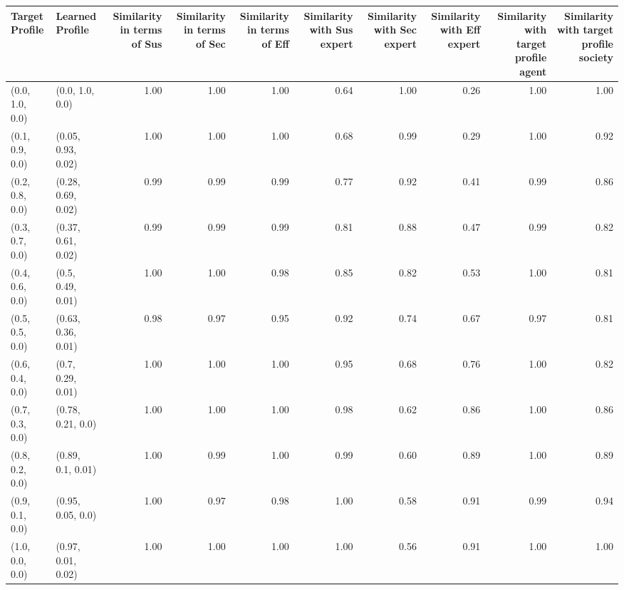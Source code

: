 \begin{tabular}{llrrrrrrrr}
\toprule
Target Profile & Learned Profile & Similarity in terms of Sus & Similarity in terms of Sec & Similarity in terms of Eff & Similarity with Sus expert & Similarity with Sec expert & Similarity with Eff expert & Similarity with target profile agent & Similarity with target profile society \\
\midrule
(0.0, 1.0, 0.0) & (0.0, 1.0, 0.0) & 1.00 & 1.00 & 1.00 & 0.64 & 1.00 & 0.26 & 1.00 & 1.00 \\
(0.1, 0.9, 0.0) & (0.05, 0.93, 0.02) & 1.00 & 1.00 & 1.00 & 0.68 & 0.99 & 0.29 & 1.00 & 0.92 \\
(0.2, 0.8, 0.0) & (0.28, 0.69, 0.02) & 0.99 & 0.99 & 0.99 & 0.77 & 0.92 & 0.41 & 0.99 & 0.86 \\
(0.3, 0.7, 0.0) & (0.37, 0.61, 0.02) & 0.99 & 0.99 & 0.99 & 0.81 & 0.88 & 0.47 & 0.99 & 0.82 \\
(0.4, 0.6, 0.0) & (0.5, 0.49, 0.01) & 1.00 & 1.00 & 0.98 & 0.85 & 0.82 & 0.53 & 1.00 & 0.81 \\
(0.5, 0.5, 0.0) & (0.63, 0.36, 0.01) & 0.98 & 0.97 & 0.95 & 0.92 & 0.74 & 0.67 & 0.97 & 0.81 \\
(0.6, 0.4, 0.0) & (0.7, 0.29, 0.01) & 1.00 & 1.00 & 1.00 & 0.95 & 0.68 & 0.76 & 1.00 & 0.82 \\
(0.7, 0.3, 0.0) & (0.78, 0.21, 0.0) & 1.00 & 1.00 & 1.00 & 0.98 & 0.62 & 0.86 & 1.00 & 0.86 \\
(0.8, 0.2, 0.0) & (0.89, 0.1, 0.01) & 1.00 & 0.99 & 1.00 & 0.99 & 0.60 & 0.89 & 1.00 & 0.89 \\
(0.9, 0.1, 0.0) & (0.95, 0.05, 0.0) & 1.00 & 0.97 & 0.98 & 1.00 & 0.58 & 0.91 & 0.99 & 0.94 \\
(1.0, 0.0, 0.0) & (0.97, 0.01, 0.02) & 1.00 & 1.00 & 1.00 & 1.00 & 0.56 & 0.91 & 1.00 & 1.00 \\
\bottomrule
\end{tabular}
